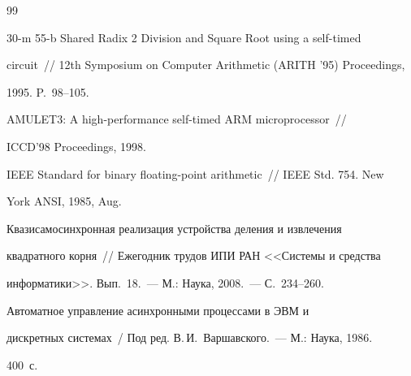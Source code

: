 {\frenchspacing\small




\begin{thebibliography}{99}












   30-m 55-b Shared Radix 2 Division and Square Root using a self-timed


circuit~// 12th Symposium on Computer Arithmetic (ARITH '95) Proceedings,


1995. P.~98--105.









   AMULET3: A high-performance self-timed ARM microprocessor~//


ICCD'98 Proceedings, 1998.







   IEEE Standard for binary floating-point arithmetic~// IEEE Std. 754. New


York ANSI, 1985, Aug.









   Квазисамосинхронная реализация устройства деления и извлечения


квадратного корня~// Ежегодник трудов ИПИ РАН <<Системы и средства


информатики>>. Вып.~18.~--- М.: Наука, 2008.~---  С.~234--260.







   Автоматное управление асинхронными процессами в ЭВМ и


дискретных системах~/ Под ред. В.\,И.~Варшавского.~--- М.: Наука, 1986.


400~с.






\end{thebibliography}}
